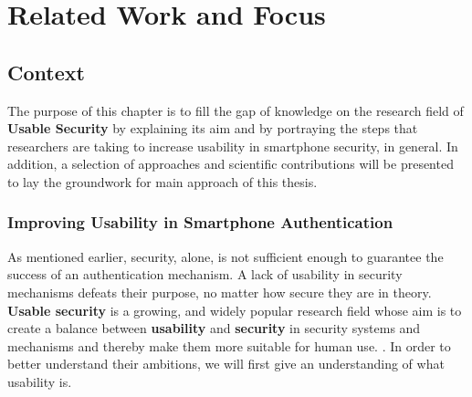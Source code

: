 
\chapter{Related Work and Focus}\label{ch:second}

\section{Context}

The purpose of this chapter is to fill the gap of knowledge on the research field of \textbf{Usable Security} by explaining its aim and by portraying the steps that researchers are taking to increase usability in smartphone security, in general. In addition, a selection of approaches and scientific contributions will be presented to lay the groundwork for main approach of this thesis. 
 
\subsection{Improving Usability in Smartphone Authentication} \label{2.1.2}

As mentioned earlier, security, alone, is not sufficient enough to guarantee the success of an authentication mechanism. A lack of usability in security mechanisms defeats their purpose, no matter how secure they are in theory. \textbf{Usable security} is a growing, and widely popular research field whose aim is to create a balance between \textbf{usability} and \textbf{security} in security systems and mechanisms and thereby make them more suitable for human use. \cite{Realpe-Munoz, Zezschwitz}. In order to better understand their ambitions, we will first give an understanding of what usability is. \\

